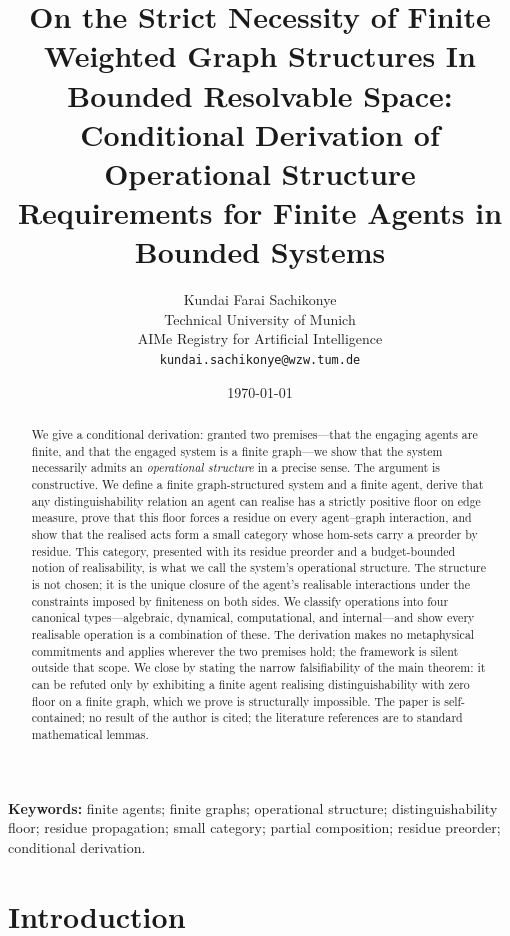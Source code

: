 \documentclass[11pt,twocolumn,a4paper]{article}
\title{\textbf{On the Strict Necessity of Finite Weighted Graph Structures In Bounded Resolvable Space:\\ Conditional Derivation of Operational Structure Requirements for Finite Agents in Bounded Systems}}
\author{%
Kundai Farai Sachikonye\\
\small Technical University of Munich\\
\small AIMe Registry for Artificial Intelligence\\
\small \texttt{kundai.sachikonye@wzw.tum.de}}
\date{\today}
\theoremstyle{thmstyle}
\theoremstyle{definition}
\theoremstyle{remark}
\begin{document}
\maketitle

\begin{abstract}
\noindent
We give a conditional derivation: granted two premises---that the
engaging agents are finite, and that the engaged system is a finite
graph---we show that the system necessarily admits an
\emph{operational structure} in a precise sense. The argument is
constructive. We define a finite graph-structured system and a finite
agent, derive that any distinguishability relation an agent can
realise has a strictly positive floor on edge measure, prove that
this floor forces a residue on every agent--graph interaction, and
show that the realised acts form a small category whose hom-sets
carry a preorder by residue. This category, presented with its
residue preorder and a budget-bounded notion of realisability, is
what we call the system's operational structure. The structure is
not chosen; it is the unique closure of the agent's realisable
interactions under the constraints imposed by finiteness on both
sides. We classify operations into four canonical types---algebraic,
dynamical, computational, and internal---and show every realisable
operation is a combination of these. The derivation makes no
metaphysical commitments and applies wherever the two premises
hold; the framework is silent outside that scope. We close by
stating the narrow falsifiability of the main theorem: it can be
refuted only by exhibiting a finite agent realising
distinguishability with zero floor on a finite graph, which we prove
is structurally impossible. The paper is self-contained; no result
of the author is cited; the literature references are to standard
mathematical lemmas.
\end{abstract}

\medskip
\noindent\textbf{Keywords:} finite agents; finite graphs; operational
structure; distinguishability floor; residue propagation; small
category; partial composition; residue preorder; conditional
derivation.

\tableofcontents

\section{Introduction}
\label{sec:intro}
\end{document}
